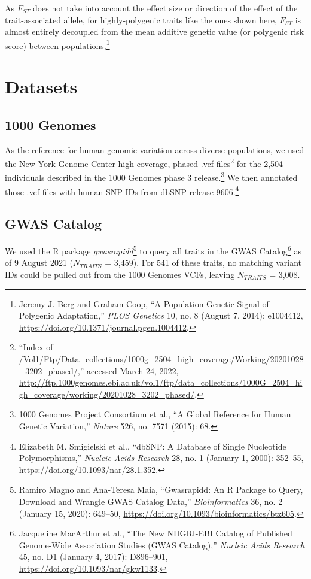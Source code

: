 \documentclass[
  9pt,
]{book}
\begin{document}
As \(F_{ST}\) does not take into account the effect size or direction of the effect of the trait-associated allele, for highly-polygenic traits like the ones shown here, \(F_{ST}\) is almost entirely decoupled from the mean additive genetic value (or polygenic risk score) between populations,\footnote{Jeremy J. Berg and Graham Coop, {``A {Population Genetic Signal} of {Polygenic Adaptation},''} \emph{PLOS Genetics} 10, no. 8 (August 7, 2014): e1004412, \url{https://doi.org/10.1371/journal.pgen.1004412}.}

\hypertarget{datasets}{%
\section{Datasets}\label{datasets}}

\hypertarget{genomes}{%
\subsection{1000 Genomes}\label{genomes}}

As the reference for human genomic variation across diverse populations, we used the New York Genome Center high-coverage, phased .vcf files\footnote{{``Index of /Vol1/Ftp/Data\_collections/{1000g}\_2504\_high\_coverage/Working/20201028\_3202\_phased/,''} accessed March 24, 2022, \url{http://ftp.1000genomes.ebi.ac.uk/vol1/ftp/data_collections/1000G_2504_high_coverage/working/20201028_3202_phased/}.} for the 2,504 individuals described in the 1000 Genomes phase 3 release.\footnote{1000 Genomes Project Consortium et al., {``A Global Reference for Human Genetic Variation,''} \emph{Nature} 526, no. 7571 (2015): 68.} We then annotated those .vcf files with human SNP IDs from dbSNP release 9606.\footnote{Elizabeth M. Smigielski et al., {``{dbSNP}: A Database of Single Nucleotide Polymorphisms,''} \emph{Nucleic Acids Research} 28, no. 1 (January 1, 2000): 352--55, \url{https://doi.org/10.1093/nar/28.1.352}.}

\hypertarget{gwas-catalog}{%
\subsection{GWAS Catalog}\label{gwas-catalog}}

We used the R package \emph{gwasrapidd}\footnote{Ramiro Magno and Ana-Teresa Maia, {``Gwasrapidd: An {R} Package to Query, Download and Wrangle {GWAS} Catalog Data,''} \emph{Bioinformatics} 36, no. 2 (January 15, 2020): 649--50, \url{https://doi.org/10.1093/bioinformatics/btz605}.} to query all traits in the GWAS Catalog\footnote{Jacqueline MacArthur et al., {``The New {NHGRI-EBI Catalog} of Published Genome-Wide Association Studies ({GWAS Catalog}),''} \emph{Nucleic Acids Research} 45, no. D1 (January 4, 2017): D896--901, \url{https://doi.org/10.1093/nar/gkw1133}.} as of 9 August 2021 (\(N_{TRAITS}\) = 3,459). For 541 of these traits, no matching variant IDs could be pulled out from the 1000 Genomes VCFs, leaving \(N_{TRAITS}\) = 3,008.
\end{document}
